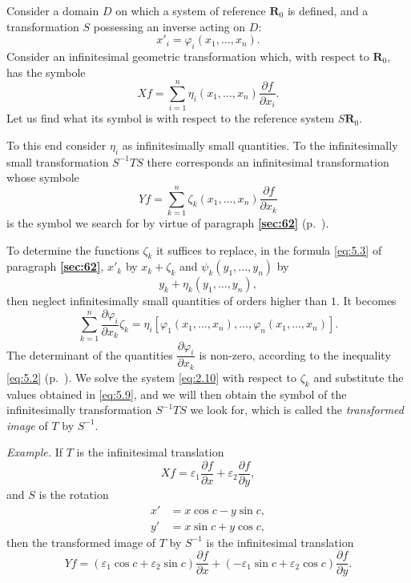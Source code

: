\documentclass[leqno,11pt]{book}
\makeatletter
\numberwithin{equation}{chapter}
\newcommand{\pd}{\partial}
\theoremstyle{shape1}
\theoremstyle{shapesmall}
\let\old@phi\phi
\let\old@varphi\varphi
\let\old@epsilon\epsilon
\let\old@varepsilon\varepsilon
\let\phi\old@varphi
\let\varphi\old@phi
\let\epsilon\old@varepsilon
\let\varepsilon\old@epsilon
\newcommand{\fsref}[1]{{\rm\textsection\textbf{\ref{sec:#1}}}}
\newcommand{\somespace}{\vspace{9pt}}
\makeatother
\begin{document}
Consider a domain $D$ on which a system of reference $\mathbf{R}_{0}$ is defined, and a transformation $S$ possessing an inverse acting on $D$:
\begin{equation}
  \label{eq:5.S}\tag{S}
  x'_{i}=\phi_{i}(x_{1},\dots,x_{n}).
\end{equation}
Consider an infinitesimal geometric transformation which, with respect to $\mathbf{R}_{0}$, has the symbole
\begin{equation}
  \label{eq:5.T}\tag{T}
  Xf=\sum_{i=1}^{n}\eta_{i}(x_{1},\dots,x_{n})\frac{\pd f}{\pd x_{i}}.
\end{equation}
Let us find what its symbol is with respect to the reference system $S\mathbf{R}_{0}$.

To this end consider $\eta_{i}$ as infinitesimally small quantities. To the infinitesimally small transformation $S^{-1}TS$ there corresponds an infinitesimal transformation whose symbole
\begin{equation}
  \label{eq:5.9}
  Yf=\sum_{k=1}^{n}\zeta_{k}(x_{1},\dots,x_{n})\frac{\pd f}{\pd x_{k}}
\end{equation}
is the symbol we search for by virtue of paragraph \fsref{62} (p.~\pageref{sec:62}).

To determine the functions $\zeta_{k}$ it suffices to replace, in the formula \eqref{eq:5.3} of paragraph \fsref{62}, $x'_{k}$ by $x_{k}+\zeta_{k}$ and $\psi_{k}(y_{1},\dots,y_{n})$ by
\[
y_{k}+\eta_{k}(y_{1},\dots,y_{n}),
\]
then neglect infinitesimally small quantities of orders higher than $1$. It becomes
\begin{equation}
  \label{eq:5.10}
  \sum_{k=1}^{n}\frac{\pd\phi_{i}}{\pd x_{k}}\zeta_{k}=\eta_{i}[\phi_{1}(x_{1},\dots,x_{n}),\dots,\phi_{n}(x_{1},\dots,x_{n})].
\end{equation}
The determinant of the quantities $\dfrac{\pd\phi_{i}}{\pd x_{k}}$ is non-zero, according to the inequality \eqref{eq:5.2} (p.~\pageref{eq:5.2}). We solve the system \eqref{eq:2.10} with respect to $\zeta_{k}$ and substitute the values obtained in \eqref{eq:5.9}, and we will then obtain the symbol of the infinitesimally transformation $S^{-1}TS$ we look for, which is called the \emph{transformed image} of $T$ by $S^{-1}$.

\somespace

{\small
\emph{Example.} If $T$ is the infinitesimal translation
\[
Xf=\epsilon_{1}\frac{\pd f}{\pd x}+\epsilon_{2}\frac{\pd f}{\pd y},
\]
and $S$ is the rotation
\begin{align*}
  x'&=x\cos c-y\sin c,\\
  y'&=x\sin c+y\cos c,
\end{align*}
then the transformed image of $T$ by $S^{-1}$ is the infinitesimal translation
\[
Yf=(\epsilon_{1}\cos c+\epsilon_{2}\sin c)\frac{\pd f}{\pd x}+(-\epsilon_{1}\sin c+\epsilon_{2}\cos c)\frac{\pd f}{\pd y}.
\]}
\end{document}

